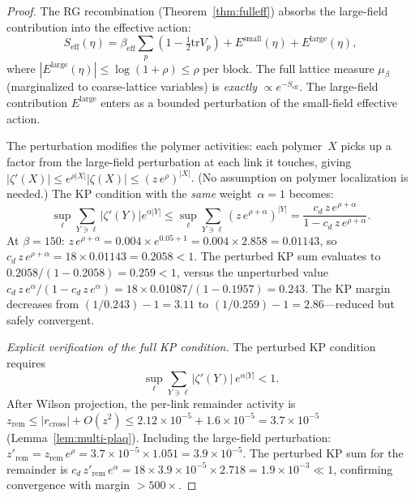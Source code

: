 \documentclass[11pt]{article}
\theoremstyle{definition}
\newcommand{\tr}{\mathrm{tr}}
\begin{document}
\begin{proof}
The RG recombination
(Theorem~\ref{thm:fulleff}) absorbs the large-field
contribution into the effective action:
\begin{equation}
S_{\mathrm{eff}}(\eta)
=\beta_{\mathrm{eff}}\sum_p(1-\tfrac{1}{2}\tr V_p)
+E^{\mathrm{small}}(\eta)
+E^{\mathrm{large}}(\eta),
\end{equation}
where $|E^{\mathrm{large}}(\eta)|\le\log(1+\rho)\le\rho$
per block.
The full lattice measure $\mu_\beta$ (marginalized to
coarse-lattice variables) is \emph{exactly}
$\propto e^{-S_{\mathrm{eff}}}$.  The large-field
contribution $E^{\mathrm{large}}$ enters as a bounded
perturbation of the small-field effective action.

The perturbation modifies the polymer activities: each
polymer~$X$ picks up a factor from the large-field
perturbation at each link it touches, giving
$|\zeta'(X)|\le e^{\rho|X|}|\zeta(X)|\le (z\,e^\rho)^{|X|}$.
(No assumption on polymer localization is needed.)
The KP condition with the \emph{same}
weight~$\alpha=1$ becomes:
\begin{equation}
\sup_\ell\sum_{Y\ni\ell}|\zeta'(Y)|e^{\alpha|Y|}
\le\sup_\ell\sum_{Y\ni\ell}(z\,e^{\rho+\alpha})^{|Y|}
=\frac{c_d\,z\,e^{\rho+\alpha}}{1-c_d\,z\,e^{\rho+\alpha}}.
\end{equation}
At $\beta=150$: $z\,e^{\rho+\alpha}=0.004\times e^{0.05+1}
=0.004\times 2.858=0.01143$, so $c_d\,z\,e^{\rho+\alpha}
=18\times 0.01143=0.2058<1$.  The perturbed KP sum evaluates to
$0.2058/(1-0.2058)=0.259<1$, versus the unperturbed value
$c_d\,z\,e^\alpha/(1-c_d\,z\,e^\alpha)
=18\times 0.01087/(1-0.1957)=0.243$.
The KP margin decreases from
$(1/0.243)-1=3.11$ to $(1/0.259)-1=2.86$---reduced but
safely convergent.

\emph{Explicit verification of the full KP condition.}
The perturbed KP condition requires
\begin{equation}
\sup_\ell\sum_{Y\ni\ell}|\zeta'(Y)|\,e^{\alpha|Y|}<1.
\end{equation}
After Wilson projection, the per-link remainder activity is
$z_{\mathrm{rem}}\le|r_{\mathrm{cross}}|+O(z^2)
\le 2.12\times 10^{-5}+1.6\times 10^{-5}
=3.7\times 10^{-5}$ (Lemma~\ref{lem:multi-plaq}).
Including the large-field perturbation:
$z'_{\mathrm{rem}}=z_{\mathrm{rem}}\,e^\rho
=3.7\times 10^{-5}\times 1.051=3.9\times 10^{-5}$.
The perturbed KP sum for the remainder is
$c_d\,z'_{\mathrm{rem}}\,e^\alpha
=18\times 3.9\times 10^{-5}\times 2.718
=1.9\times 10^{-3}\ll 1$,
confirming convergence with margin $>500\times$.


\end{proof}
\end{document}
